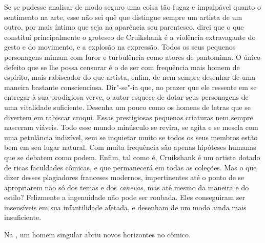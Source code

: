 Se se pudesse analisar de modo seguro uma coisa tão fugaz e impalpável
quanto o sentimento na arte, esse não sei quê que distingue sempre um
artista de um outro, por mais íntimo que seja na aparência seu
parentesco, direi que o que constitui principalmente o grotesco de
Cruikshank é a violência extravagante do gesto e do movimento, e a
explosão na expressão. Todos os seus pequenos personagens mimam com
furor e turbulência como atores de pantomima. O único defeito que se
lhe possa censurar é o de ser com frequência mais homem de espírito,
mais rabiscador do que artista, enfim, de nem sempre desenhar de uma
maneira bastante conscienciosa. Dir"-se"-ia que, no prazer que ele
ressente em se entregar à sua prodigiosa verve, o autor esquece de
dotar seus personagens de uma vitalidade suficiente. Desenha um pouco
como os homens de letras que se divertem em rabiscar croqui. Essas
prestigiosas pequenas criaturas nem sempre nasceram viáveis. Todo esse
mundo minúsculo se revira, se agita e se mescla com uma petulância
indizível, sem se inquietar muito se todos os seus membros estão bem em
seu lugar natural. Com muita frequência são apenas hipóteses humanas
que se debatem como podem. Enfim, tal como é, Cruikshank é um artista	
dotado de ricas faculdades cômicas, e que permanecerá em todas as
coleções. Mas o que dizer desses plagiadores franceses modernos,
impertinentes até o ponto de se apropriarem não só dos temas e dos
\textit{canevas}, mas até mesmo da maneira e do estilo? Felizmente a
ingenuidade não pode ser roubada. Eles conseguiram ser insensíveis em
sua infantilidade afetada, e desenham de um modo ainda mais
insuficiente.

\sectionitem

Na , um homem singular abriu novos horizontes no cômico.


